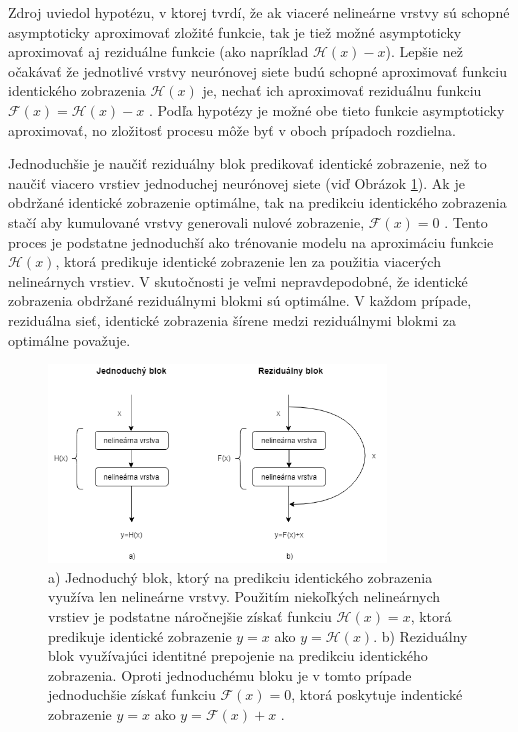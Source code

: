 Zdroj \cite{Wu2017} uviedol hypotézu, v ktorej tvrdí, že ak viaceré nelineárne vrstvy sú schopné asymptoticky aproximovať zložité funkcie, tak je tiež možné asymptoticky aproximovať aj reziduálne funkcie (ako napríklad $\mathcal{H}(x) - x$). Lepšie než očakávať že jednotlivé vrstvy neurónovej siete budú schopné aproximovať funkciu identického zobrazenia $\mathcal{H}(x)$ je, nechať ich aproximovať reziduálnu funkciu $\mathcal{F}(x) = \mathcal{H}(x) - x$ \cite{Wu2017}. Podľa hypotézy je možné obe tieto funkcie asymptoticky aproximovať, no zložitosť procesu môže byť v oboch prípadoch rozdielna.

Jednoduchšie je naučiť reziduálny blok predikovať identické zobrazenie, než to naučiť viacero vrstiev jednoduchej neurónovej siete (viď Obrázok \ref{fig:plainNetVsResNet}). Ak je obdržané identické zobrazenie optimálne, tak na predikciu identického zobrazenia stačí aby kumulované vrstvy generovali nulové zobrazenie, $\mathcal{F}(x)=0$ \cite{Wu2017}. Tento proces je podstatne jednoduchší ako trénovanie modelu na aproximáciu funkcie $\mathcal{H}(x)$, ktorá predikuje identické zobrazenie len za použitia viacerých nelineárnych vrstiev. V skutočnosti je veľmi nepravdepodobné, že identické zobrazenia obdržané reziduálnymi blokmi sú optimálne. V každom prípade, reziduálna sieť, identické zobrazenia šírene medzi reziduálnymi blokmi za optimálne považuje.

\begin{figure}

\centerline{\includegraphics[width=0.8\textwidth]{images/plainNetVsResNet}}
\caption[Porovnanie jednoduhcého a reziduálneho bloku]{a) Jednoduchý blok, ktorý na predikciu identického zobrazenia využíva len nelineárne vrstvy. Použitím niekoľkých nelineárnych vrstiev je podstatne náročnejšie získať funkciu $\mathcal{H}(x)=x$, ktorá predikuje identické zobrazenie $y=x$ ako $y=\mathcal{H}(x)$. b) Reziduálny blok využívajúci identitné prepojenie na predikciu identického zobrazenia. Oproti jednoduchému bloku je v tomto prípade jednoduchšie získať funkciu $\mathcal{F}(x)=0$, ktorá poskytuje indentické zobrazenie $y=x$ ako $y=\mathcal{F}(x)+x$ \cite{Wu2017}.}
\label{fig:plainNetVsResNet}
\end{figure}


